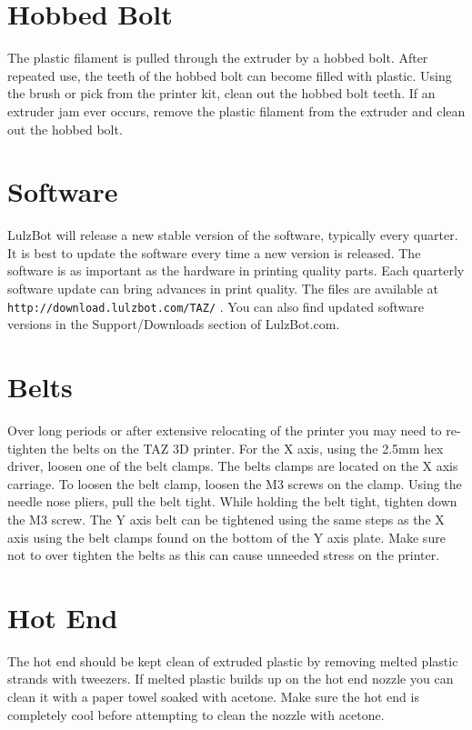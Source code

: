 \section{Hobbed Bolt}
The plastic filament is pulled through the extruder by a hobbed bolt. After repeated use, the teeth of the hobbed bolt can become filled with plastic. Using the brush or pick from the printer kit, clean out the hobbed bolt teeth. If an extruder jam ever occurs, remove the plastic filament from the extruder and clean out the hobbed bolt.

\section{Software}
LulzBot will release a new stable version of the software, typically every quarter. It is best to update the software every time a new version is released. The software is as important as the hardware in printing quality parts. Each quarterly software update can bring advances in print quality. The files are available at \texttt{http://download.lulzbot.com/TAZ/} . You can also find updated software versions in the Support/Downloads section of LulzBot.com.

\section{Belts}
Over long periods or after extensive relocating of the printer you may need to re-tighten the belts on the TAZ 3D printer. For the X axis, using the 2.5mm hex driver, loosen one of the belt clamps. The belts clamps are located on the X axis carriage. To loosen the belt clamp, loosen the M3 screws on the clamp. Using the needle nose pliers, pull the belt tight. While holding the belt tight, tighten down the M3 screw. The Y axis belt can be tightened using the same steps as the X axis using the belt clamps found on the bottom of the Y axis plate. Make sure not to over tighten the belts as this can cause unneeded stress on the printer.

\section{Hot End}
The hot end should be kept clean of extruded plastic by removing melted plastic strands with tweezers. If melted plastic builds up on the hot end nozzle you can clean it with a paper towel soaked with acetone. Make sure the hot end is completely cool before attempting to clean the nozzle with acetone.


